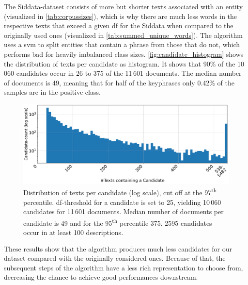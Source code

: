 The Siddata-dataset consists of more but shorter texts associated with an entity (visualized in \autoref{tab:corpussizes}), which is why there are much less words in the respective texts that exceed a given \gls{df} for the Siddata when compared to the originally used ones (visualized in \autoref{tab:summed_unique_words}). The algorithm uses a \gls{svm} to split entities that contain a phrase from those that do not, which performs bad for heavily imbalanced class sizes. \autoref{fig:candidate_histogram} shows the distribution of texts per candidate as histogram. It shows that 90\% of the 10\,060 candidates occur in 26 to 375 of the 11\,601 documents. The median number of documents is 49, meaning that for half of the keyphrases only 0.42\% of the samples are in the positive class.

\begin{figure}[H]
	\centering
	\includegraphics[width=\figwidth]{graphics/dataset_new/docs_per_phrase.pdf}
	\caption[Distribution of texts per candidate]{Distribution of texts per candidate (log scale), cut off at the 97\textsuperscript{th} percentile. \Gls{df}-threshold for a candidate is set to 25, yielding 10\,060 candidates for 11\,601 documents. Median number of documents per candidate is 49 and for the 95\textsuperscript{th} percentile 375. 2595 candidates occur in at least 100 descriptions.}
	\label{fig:candidate_histogram}
\end{figure}

These results show that the algorithm produces much less candidates for our dataset compared with the originally considered ones. Because of that, the subsequent steps of the algorithm have a less rich representation to choose from, decreasing the chance to achieve good performances downstream.

